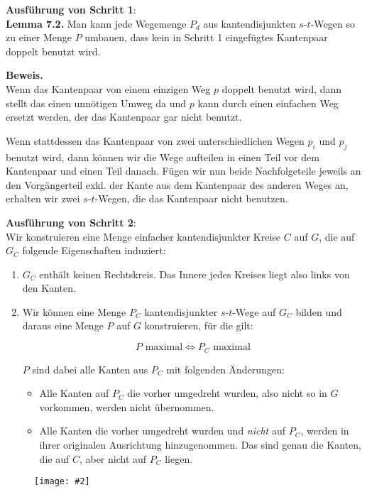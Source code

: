 \documentclass[10pt,a4paper]{article}
\makeatletter
\def\maxwidth#1{\ifdim\Gin@nat@width>#1 #1\else\Gin@nat@width\fi}
\newcommand{\imageFigure}[4]{%
    \begin{figure}[h]%
        \centering%
        {%
            \setlength{\fboxsep}{1pt}%
            \setlength{\fboxrule}{1pt}%
            \texttt{[image: \#2]}%
        }%
        \caption{#1}%
        \label{fig:#4}%
    \end{figure}%
}
\makeatother
\begin{document}
\textbf{Ausführung von Schritt 1}:\\
\textbf{Lemma 7.2.} Man kann jede Wegemenge $P_d$ aus kantendisjunkten
$s$-$t$-Wegen so zu einer Menge $P$ umbauen, dass kein in Schritt 1 eingefügtes
Kantenpaar doppelt benutzt wird.

\textbf{Beweis.}\\
Wenn das Kantenpaar von einem einzigen Weg $p$ doppelt benutzt wird, dann
stellt das einen unnötigen Umweg da und $p$ kann durch einen einfachen Weg
ersetzt werden, der das Kantenpaar gar nicht benutzt.

Wenn stattdessen das Kantenpaar von zwei unterschiedlichen Wegen $p_i$ und
$p_j$ benutzt wird, dann können wir die Wege aufteilen in einen Teil vor dem
Kantenpaar und einen Teil danach.
Fügen wir nun beide Nachfolgeteile jeweils an den Vorgängerteil exkl. der Kante
aus dem Kantenpaar des anderen Weges an, erhalten wir zwei $s$-$t$-Wegen, die
das Kantenpaar nicht benutzen.

\textbf{Ausführung von Schritt 2}:\\
Wir konstruieren eine Menge einfacher kantendisjunkter Kreise $C$ auf $G$, die
auf $G_C$ folgende Eigenschaften induziert:

\begin{enumerate}
    \item $G_C$ enthält keinen Rechtskreis.
        Das Innere jedes Kreises liegt also links von den Kanten.
    \item Wir können eine Menge $P_C$ kantendisjunkter $s$-$t$-Wege auf $G_C$
        bilden und daraus eine Menge $P$ auf $G$ konstruieren, für die gilt:

        $$ P \text{ maximal} \iff P_C \text{ maximal} $$

        $P$ sind dabei alle Kanten aus $P_C$ mit folgenden Änderungen:
        \begin{itemize}
            \item Alle Kanten auf $P_C$ die vorher umgedreht wurden, also nicht
                so in $G$ vorkommen, werden nicht übernommen.
            \item Alle Kanten die vorher umgedreht wurden und \textit{nicht}
                auf $P_C$, werden in ihrer originalen Ausrichtung
                hinzugenommen.
                Das sind genau die Kanten, die auf $C$, aber nicht auf $P_C$
                liegen.
        \end{itemize}
\end{enumerate}

\imageFigure{}{menger1.png}{.75}{menger1}
\end{document}
